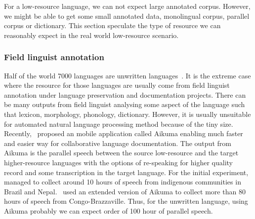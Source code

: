 \documentclass[12pt,twoside,final,hidelinks]{ltthesis}
\theoremstyle{definition}
\begin{document}
For a low-resource language, we can not expect large annotated corpus. However, we might be able to get some small annotated data, monolingual corpus, parallel corpus or dictionary. This section speculate the type of resource we can reasonably expect in the real world low-resource scenario. 
\subsubsection{Field linguist annotation}
Half of the world 7000 languages are unwritten languages~\cite{lewis2009}. It is the 
extreme case where the resource for those languages are usually come from field 
linguist annotation under language preservation and documentation projects. There can 
be many outputs from field linguist analysing some aspect of the language such that 
lexicon, morphology, phonology, dictionary. However, it is usually unsuitable for 
automated natural language processing method because of the tiny size. 
Recently,~ proposed an mobile application called 
Aikuma enabling much faster and easier way for collaborative language documentation. The output from Aikuma is the parallel speech between the source low-resource and the target higher-resource 
languages with the options of re-speaking for higher quality record and some 
transcription in the target language. For the initial experiment,~ managed to collect around 10 hours of speech from indigenous 
communities in Brazil and Nepal.~ used an extended version of Aikuma to collect more than 80 hours of speech from Congo-Brazzaville. 
Thus, for the unwritten language, using Aikuma probably we can expect order of 100 hour of parallel speech. 
\end{document}
